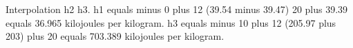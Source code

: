 Interpolation h2 h3. h1 equals minus 0 plus 12 (39.54 minus 39.47) 20 plus 39.39 equals 36.965 kilojoules per kilogram. h3 equals minus 10 plus 12 (205.97 plus 203) plus 20 equals 703.389 kilojoules per kilogram.